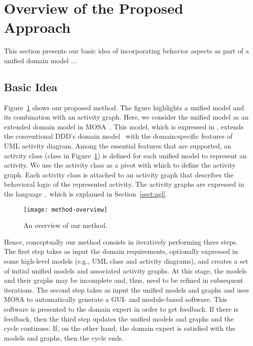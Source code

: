 \section{Overview of the Proposed Approach}
\label{sect:overviewApproach}

This section presents our basic idea of %
%
incorporating behavior aspects as part of a unified domain model ...

\subsection{Basic Idea}

Figure~\ref{fig:method-overview} shows our proposed method. The figure highlights a unified model and its combination with an activity graph. Here, we consider the unified model as an extended domain model in MOSA~\cite{le_domain_2018}. This model, which is expressed in \dcsl, extends the conventional DDD's domain model~\cite{evans_domain-driven_2004} with the domain-specific features of UML activity diagram. Among the essential features that are supported, an activity class (\eg class  in Figure~\ref{fig:method-overview}) is defined for each unified model to represent an activity. We use the activity class as a pivot with which to define the activity graph. Each activity class is attached to an activity graph that describes the behavioral logic of the represented activity. The activity graphs are expressed in the language \agl,~which is explained in Section~\ref{sect:agl}.

\begin{figure}[ht]
	\begin{center}
		\texttt{[image: method-overview]}
	\end{center}
	\caption{An overview of our method.} %
	\label{fig:method-overview}
\end{figure}

Hence, conceptually our method consists in iteratively performing three steps. The first step takes as input the domain requirements, optionally expressed in some high-level models (e.g., UML class and activity diagrams), and creates a set of initial unified models and associated activity graphs. At this stage, the models and their graphs may be incomplete and, thus, need to be refined in subsequent iterations. The second step takes as input the unified models and graphs and uses MOSA to automatically generate a GUI- and module-based software. This software is presented to the domain expert in order to get feedback. If there is feedback, then the third step updates the unified models and graphs and the cycle continues. If, on the other hand, the domain expert is satisfied with the models and graphs, then the cycle ends.

